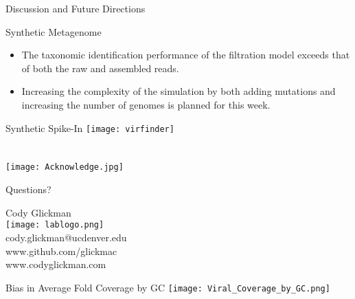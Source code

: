 \documentclass[11pt]{beamer}
\begin{document}
	\begin{frame}{Discussion and Future Directions}
	
	\begin{block}{Synthetic Metagenome}
	\begin{itemize}
	\item The taxonomic identification performance of the filtration model exceeds that of both the raw and assembled reads. 
	\item Increasing the complexity of the simulation by both adding mutations and increasing the number of genomes is planned for this week. 
	\end{itemize}
	\end{block}
	\begin{block}{Synthetic Spike-In}
	\texttt{[image: virfinder]}
	\end{block}
	\end{frame}
	
\section{}
	
	\begin{frame}{}
	\vspace{1cm}
	{\texttt{[image: Acknowledge.jpg]} }
	\end{frame}
	
	
	\begin{frame}{Questions?}
	
	Cody Glickman \\ \texttt{[image: lablogo.png]} \\ cody.glickman@ucdenver.edu \\ \alert{www.github.com/glickmac} \\ www.codyglickman.com
	\end{frame}
	
	
	\begin{frame}{Bias in Average Fold Coverage by GC}
	\texttt{[image: Viral\_Coverage\_by\_GC.png]}
	\end{frame}
	
\end{document}

